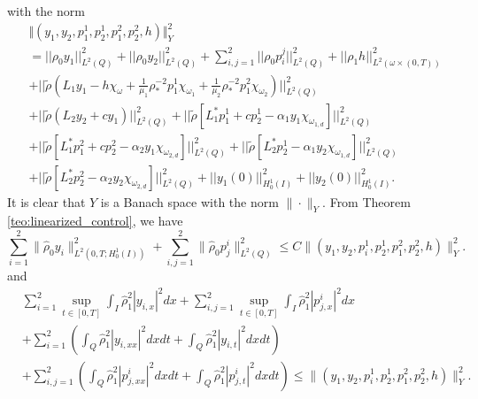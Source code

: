 \documentclass[11pt,a4paper]{amsart}
\numberwithin{equation}{section}
\providecommand{\norm}[1]{\lvert\lvert#1\rvert\rvert}
\begin{document}
\noindent with the norm
\begin{equation*}
\begin{split}
&\Vert(y_1,y_2,p^1_1,p^1_2,p^2_1,p^2_2,h)\Vert^2_Y \\
&=\norm{\rho_0 y_1} ^2_{L^2(Q)}+\norm{\rho_0 y_2} ^2_{L^2(Q)}+\sum_{i,j=1}^{2}\norm{\rho_0 p_i^j} ^2_{L^2(Q)}+\norm{\rho_1 h} ^2_{L^2(\omega\times (0,T))}\\
    &+\norm{\tilde{\rho}(L_1 y_{1} -h\chi_\omega +\frac{1}{\mu_1}\rho_*^{-2}p_1^1\chi_{\omega_1} +\frac{1}{\mu_2}\rho_*^{-2}p_1^2\chi_{\omega_2})}^{2}_{L^2(Q)}\\
    &+\norm{\tilde{\rho}(L_2 y_{2}  +cy_1)}^{2}_{L^2(Q)} +\norm{\tilde{\rho}[L_1^*p_1^1 +cp_2^1 -\alpha_1 y_1 \chi_{\omega_{1,d}}]}^{2}_{L^2(Q)}\\
    &+\norm{\tilde{\rho}[L_1^* p_1^2+cp_2^2 -\alpha_2 y_1 \chi_{\omega_{2,d}}]}^{2}_{L^2(Q)}+\norm{\tilde{\rho}[L_2^* p_2^1 -\alpha_1 y_2 \chi_{\omega_{1,d}}]}^{2}_{L^2(Q)}\\
    &+\norm{\tilde{\rho}[L_2^* p_2^2 -\alpha_2 y_2 \chi_{\omega_{2,d}}]}^{2}_{L^2(Q)}+\norm{y_1(0)}^2_{H^1_0(I)}+\norm{y_2(0)}^2_{H^1_0(I)}.
\end{split}
\end{equation*}
It is clear that $Y$ is a Banach space with the norm $\| \cdot \|_Y$. From Theorem \ref{teo:linearized_control}, we have
$$
\sum_{i=1}^2 \| \hat \rho_0 y_i \|^2_{L^2(0,T;H_0^1(I))} + \sum_{i,j=1}^2 \| \hat \rho_0 p_j^i \|^2_{L^2(Q)} \leq C \| (y_1,y_2,p_i^1,p_2^1,p_1^2,p_2^2,h) \|_Y^2.
$$
and
\begin{equation*}
    \begin{split}
        &\sum_{i=1}^2 \sup_{t \in [0,T]} \int_I \hat \rho_1^2 |y_{i,x}|^2 dx + \sum_{i,j=1}^2 \sup_{t \in [0,T]} \int_I \hat \rho_1^2 |p_{j,x}^i|^2 dx \\
        &+ \sum_{i=1}^2 \left( \int_Q \hat \rho_1^2 |y_{i,xx}|^2 dxdt + \int_Q \hat \rho_1^2 |y_{i,t}|^2 dxdt \right) \\
        & + \sum_{i,j=1}^2 \left( \int_Q \hat \rho_1^2 |p_{j,xx}^i|^2 dxdt + \int_Q \hat \rho_1^2 |p_{j,t}^i|^2 dxdt \right) \leq \| (y_1,y_2,p_i^1,p_2^1,p_1^2,p_2^2,h) \|_Y^2.        
    \end{split}
\end{equation*}
\end{document}
